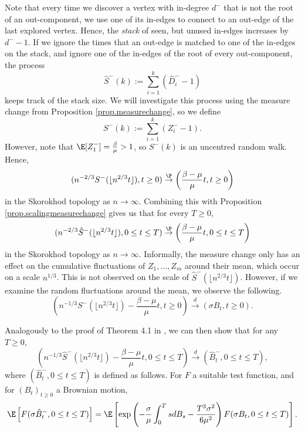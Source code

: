 Note that every time we discover a vertex with in-degree $d^-$ that is not the root of an out-component, we use one of its in-edges to connect to an out-edge of the last explored vertex. Hence, the \emph{stack} of seen, but unused in-edges increases by $d^--1$. If we ignore the times that an out-edge is matched to one of the in-edges on the stack, and ignore one of the in-edges of the root of every out-component, the process 
$$\hat{S}^-(k):=\sum\limits_{i=1}^k(\hat{D}^-_i-1)$$ keeps track of the stack size. We will investigate this process using the measure change from Proposition \ref{prop.measurechange}, so we define 
$${S}^-(k):=\sum\limits_{i=1}^k(Z^-_i-1).$$
However, note that $\E[Z^-_1]=\frac{\beta}{\mu}>1$, so ${S}^-(k)$ is an uncentred random walk. Hence,
\begin{equation}\label{eq.convergenceinprocess} (n^{-2/3}{S}^-(\lfloor n^{2/3}t\rfloor),t\geq 0) \overset{\P}{\to} \left(\frac{\beta-\mu}{\mu}t, t\geq 0\right)\end{equation}
in the Skorokhod topology as $n\to \infty$.
Combining this with Proposition \ref{prop.scalingmeasurechange} gives us that for every $T\geq 0$,
\begin{equation}\label{eq.convergenceorderedinedges} (n^{-2/3}\hat{S}^-(\lfloor n^{2/3}t\rfloor),0\leq t \leq T) \overset{\P}{\to} \left(\frac{\beta-\mu}{\mu}t, 0\leq t \leq T \right)\end{equation}
in the Skorokhod topology as $n\to \infty$.
Informally, the measure change only has an effect on the cumulative fluctuations of $Z_1,\dots,Z_m$ around their mean, which occur on a scale $n^{1/3}$. This is not observed on the scale of $\hat{S}^-(\lfloor n^{2/3}t\rfloor)$. However, if we examine the random fluctuations around the mean, we observe the following. 
\begin{equation}\label{eq.convergencein-edges}\left(n^{-1/3}{S}^-(\lfloor n^{2/3}t\rfloor)-\frac{\beta-\mu}{\mu}t ,t\geq 0\right) \overset{d}{\to} \left(\sigma B_t, t\geq 0\right).\end{equation}


Analogously to the proof of Theorem 4.1 in \cite{Conchon2018}, we can then show that for any $T\geq 0$,
$$\left(n^{-1/3}{\hat{S}}^-(\lfloor n^{2/3}t\rfloor)-\frac{\beta-\mu}{\mu}t ,0\leq t\leq T\right) \overset{d}{\to} \left( \hat{B}^-_t, 0\leq t \leq T \right),$$
where $(\hat{B}^-_t,0\leq t \leq T)$ is defined as follows. For $F$ a suitable test function, and for $(B_t)_{t\geq 0}$ a Brownian motion,
\begin{equation}\label{eq.measurechangeapplied} \E\left[F(\sigma\hat{B}^-_t,0\leq t \leq T)\right]=\E\left[\exp\left(-\frac{\sigma}{\mu}\int_0^T sdB_s - \frac{T^3 \sigma^2}{6\mu^2}\right)F(\sigma{B}_t,0\leq t \leq T)\right].\end{equation}
